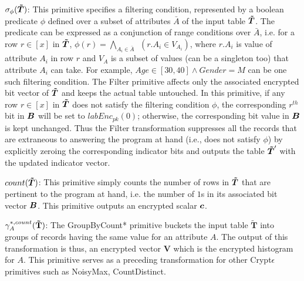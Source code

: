  $\sigma_{\phi}(\boldsymbol{\tilde{T}})$: This primitive specifies a filtering condition, represented by a boolean predicate $\phi$ defined over a subset of attributes $\bar{A}$ of the input table $\boldsymbol{\tilde{T}}$. The predicate can be expressed as a conjunction of range conditions over $\bar{A}$, i.e. for a row $r \in [x]$ in $\boldsymbol{\tilde{T}}$, $\phi(r) = \bigwedge_{A_i \in \bar{A}} ~~(r.{A_i} \in V_{A_i})$,  where $r.A_i$ is value of attribute $A_i$ in row $r$ and $V_A$ is a subset of values (can be a singleton too) that attribute $A_i$ can take.  For example, $Age\in [30,40]\wedge Gender=M$ can be one such  filtering condition. The \textsf{Filter} primitive affects only the associated encrypted bit vector of $\boldsymbol{\tilde{T}}$ and keeps the actual table untouched.  In this primitive, if any row $r \in [x]$ in $\boldsymbol{\tilde{T}}$ does not satisfy the filtering condition $\phi$, the corresponding $r^{th}$ bit in $\boldsymbol{B}$ will be set to $labEnc_{pk}(0)$; otherwise, the corresponding bit value in $\boldsymbol{B}$ is kept unchanged.  Thus the \textsf{Filter} transformation suppresses all the records that are extraneous to answering the program at hand (i.e., does not satisfy $\phi$) by explicitly zeroing the corresponding indicator bits and outputs the table $\boldsymbol{\tilde{T}}'$ with the updated indicator vector.


 $count(\boldsymbol{\tilde{T}})$: This primitive simply counts the number of rows in $\boldsymbol{\tilde{T}}$ that are pertinent to the program at hand, i.e. the number of $1$s in its associated bit vector $\boldsymbol{B}$.  This primitive outputs an encrypted scalar $\boldsymbol{c}$. 

 $\gamma^{*,count}_{A}(\mathbf{\tilde{T}})$: The  \textsf{GroupByCount*} primitive buckets the input table $\mathbf{\tilde{T}}$ into groups of records having the same value for an attribute $A$. The output of this transformation is thus, an encrypted  vector $\mathbf{V}$ which is the encrypted histogram for $A$.    This primitive serves as a preceding transformation for other Crypt$\epsilon$ primitives such as \textsf{NoisyMax}, \textsf{CountDistinct}.

